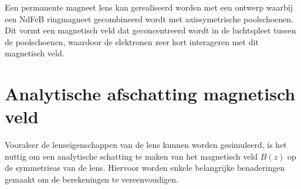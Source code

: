 \documentclass[we,twoside,openright,a4paper,11pt]{uantwerpenbamathesis}
\begin{document}

\begin{tcolorbox}[colback=blue!10!white,colframe=blue!75!black,title=Realisatie objectief 1]
    Een permanente magneet lens kan gerealiseerd worden met een ontwerp waarbij een NdFeB ringmagneet gecombineerd wordt met axissymetrische poolschoenen. Dit vormt een magnetisch veld dat geconcentreerd wordt in de luchtspleet tussen de poolschoenen, waardoor de elektronen zeer kort interageren met dit magnetisch veld.
\end{tcolorbox}

\section{Analytische afschatting magnetisch veld}
Vooraleer de lenseigenschappen van de lens kunnen worden gesimuleerd, is het nuttig om een analytische schatting te maken van het magnetisch veld $B(z)$ op de symmetrieas van de lens. Hiervoor worden enkele belangrijke benaderingen gemaakt om de berekeningen te vereenvoudigen.\\
\end{document}
